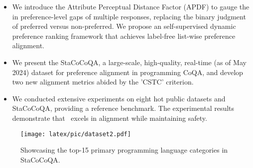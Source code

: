 


\begin{itemize}[leftmargin=*]
\item We introduce the Attribute Perceptual Distance Factor (APDF) to gauge the in preference-level gaps of multiple responses, replacing the binary judgment of preferred versus non-preferred. We propose an self-supervised dynamic preference ranking framework that achieves label-free list-wise preference alignment.
\item We present the StaCoCoQA, a large-scale, high-quality, real-time (as of May 2024) dataset for preference alignment in programming CoQA, and develop two new alignment metrics abided by the 'CSTC' criterion.
\item We conducted extensive experiments on eight hot public datasets and StaCoCoQA, providing a reference benchmark. 
The experimental results demonstrate that \shortname \ excels in alignment while maintaining safety. 
\end{itemize}
\begin{figure}[t]
    \centering
    \texttt{[image: latex/pic/dataset2.pdf]}
    \caption{Showcasing the top-15 primary programming language categories in StaCoCoQA.}
    \label{fig:dataset}
    \vspace{-0.2cm}
\end{figure}
